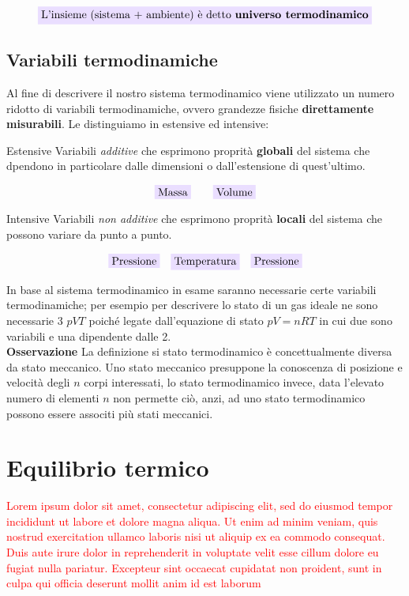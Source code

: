 \documentclass[x11names]{report}
\newcommand{\viola}[1]{\colorbox{yred}{$\displaystyle #1$}}
\begin{document}
\[ 
\viola{\text{{L'insieme (sistema + ambiente) è detto \textbf{universo termodinamico}}}}
\]
\subsection{Variabili termodinamiche}
Al fine di descrivere il nostro sistema termodinamico viene utilizzato un numero ridotto di variabili termodinamiche, ovvero grandezze fisiche \textbf{direttamente misurabili}. Le distinguiamo in estensive ed intensive:

\begin{center}
	\begin{minipage}{0.49\textwidth}
		\begin{es}{Estensive}
			Variabili \textit{additive} che esprimono proprità \textbf{globali} del sistema che dpendono in particolare dalle dimensioni o dall'estensione di quest'ultimo.
			
			\[\viola{\text{Massa}} \qquad \viola{\text{Volume}}\]
			
		\end{es}
	\end{minipage}
	\begin{minipage}{0.49\textwidth}
		\begin{es}{Intensive}
			Variabili \textit{non additive} che esprimono proprità \textbf{locali} del sistema che possono variare da punto a punto.
			
			\[\viola{\text{Pressione}} \quad \viola{\text{Temperatura}}\quad \viola{\text{Pressione}}\]
			
		\end{es}
	\end{minipage}
\end{center}
In base al sistema termodinamico in esame saranno necessarie certe variabili termodinamiche; per esempio per descrivere lo stato di un gas ideale ne sono necessarie 3 \(pVT\) poiché legate dall'equazione di stato \( pV = nRT\) in cui due sono variabili e una dipendente dalle 2.\\

\noindent
\textbf{Osservazione}  La definizione si stato termodinamico è concettualmente diversa da stato meccanico. Uno stato meccanico presuppone la conoscenza di posizione e velocità degli \(n\) corpi interessati, lo stato termodinamico invece, data l'elevato numero di elementi \(n\) non permette ciò, anzi, ad uno stato termodinamico possono essere associti più stati meccanici.

\section{Equilibrio termico}
\textcolor{red}{Lorem ipsum dolor sit amet, consectetur adipiscing elit, sed do eiusmod tempor incididunt ut labore et dolore magna aliqua. Ut enim ad minim veniam, quis nostrud exercitation ullamco laboris nisi ut aliquip ex ea commodo consequat. Duis aute irure dolor in reprehenderit in voluptate velit esse cillum dolore eu fugiat nulla pariatur. Excepteur sint occaecat cupidatat non proident, sunt in culpa qui officia deserunt mollit anim id est laborum}\\
\end{document}
